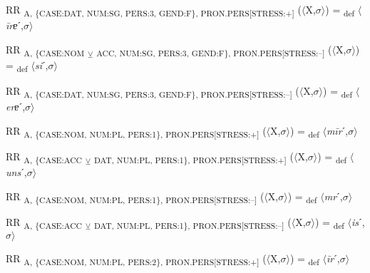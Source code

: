 {\begin{exe}
 RR \textsubscript{A, \{CASE:DAT, NUM:SG, PERS:3, GEND:F\}, PRON.PERS[STRESS:+]} ($\langle$X,$\sigma $$\rangle$) = \textsubscript{def} $\langle$\textit{\=irɐ}ˊ,$\sigma $$\rangle$
\end{exe}

\begin{exe}
 RR \textsubscript{A, \{CASE:NOM} \textsubscript{${\veebar}$}\textsubscript{ ACC, NUM:SG, PERS:3, GEND:F\}, PRON.PERS[STRESS:–]} ($\langle$X,$\sigma $$\rangle$) = \textsubscript{def} $\langle$\textit{si}ˊ,$\sigma $$\rangle$
\end{exe}

\begin{exe}
 RR \textsubscript{A, \{CASE:DAT, NUM:SG, PERS:3, GEND:F\}, PRON.PERS[STRESS:–]} ($\langle$X,$\sigma $$\rangle$) = \textsubscript{def} $\langle$\textit{erɐ}ˊ,$\sigma $$\rangle$
\end{exe}

\begin{exe}
 RR \textsubscript{A, \{CASE:NOM, NUM:PL, PERS:1\}, PRON.PERS[STRESS:+]} ($\langle$X,$\sigma $$\rangle$) = \textsubscript{def} $\langle$\textit{m\=ir}ˊ,$\sigma $$\rangle$
\end{exe}

\begin{exe}
 RR \textsubscript{A, \{CASE:ACC} \textsubscript{${\veebar}$}\textsubscript{ DAT, NUM:PL, PERS:1\}, PRON.PERS[STRESS:+]} ($\langle$X,$\sigma $$\rangle$) = \textsubscript{def} $\langle$\textit{uns}ˊ,$\sigma $$\rangle$
\end{exe}

\begin{exe}
 RR \textsubscript{A, \{CASE:NOM, NUM:PL, PERS:1\}, PRON.PERS[STRESS:–]} ($\langle$X,$\sigma $$\rangle$) = \textsubscript{def} $\langle$\textit{mr}ˊ,$\sigma $$\rangle$
\end{exe}

\begin{exe}
 RR \textsubscript{A, \{CASE:ACC} \textsubscript{${\veebar}$}\textsubscript{ DAT, NUM:PL, PERS:1\}, PRON.PERS[STRESS:–]} ($\langle$X,$\sigma $$\rangle$) = \textsubscript{def} $\langle$\textit{is}ˊ,$\sigma $$\rangle$
\end{exe}

\begin{exe}
 RR \textsubscript{A, \{CASE:NOM, NUM:PL, PERS:2\}, PRON.PERS[STRESS:+]} ($\langle$X,$\sigma $$\rangle$) = \textsubscript{def} $\langle$\textit{\=ir}ˊ,$\sigma $$\rangle$
\end{exe}

}
